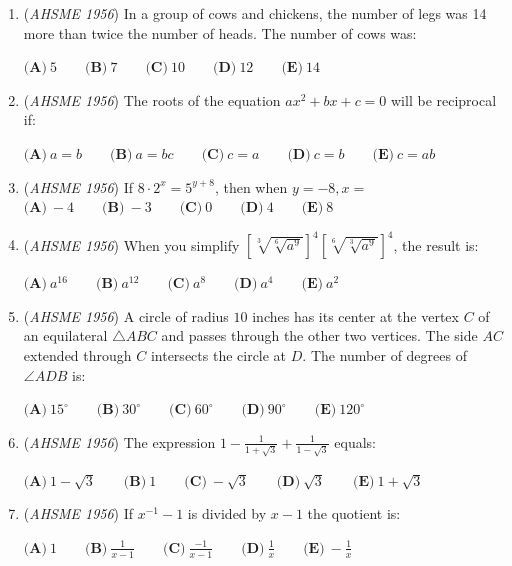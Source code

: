 \begin{enumerate}
	\item (\textit{AHSME 1956}) In a group of cows and chickens, the number of legs was 14 more than twice the number of heads. The number of cows was: 


 $\textbf{(A)}\ 5 \qquad\textbf{(B)}\ 7 \qquad\textbf{(C)}\ 10 \qquad\textbf{(D)}\ 12 \qquad\textbf{(E)}\ 14$


	\item (\textit{AHSME 1956}) The roots of the equation $ax^2 + bx + c = 0$ will be reciprocal if: 


 $\textbf{(A)}\ a = b \qquad\textbf{(B)}\ a = bc \qquad\textbf{(C)}\ c = a \qquad\textbf{(D)}\ c = b \qquad\textbf{(E)}\ c = ab$


	\item (\textit{AHSME 1956}) If $8\cdot2^x = 5^{y + 8}$, then when $y = - 8,x =$
$\textbf{(A)}\ - 4 \qquad\textbf{(B)}\ - 3 \qquad\textbf{(C)}\ 0 \qquad\textbf{(D)}\ 4 \qquad\textbf{(E)}\ 8$


	\item (\textit{AHSME 1956}) When you simplify $\left[ \sqrt [3]{\sqrt [6]{a^9}} \right]^4\left[ \sqrt [6]{\sqrt [3]{a^9}} \right]^4$, the result is: 


 $\textbf{(A)}\ a^{16} \qquad\textbf{(B)}\ a^{12} \qquad\textbf{(C)}\ a^8 \qquad\textbf{(D)}\ a^4 \qquad\textbf{(E)}\ a^2$


	\item (\textit{AHSME 1956}) A circle of radius $10$ inches has its center at the vertex $C$ of an equilateral $\triangle ABC$ and passes through the other two vertices. 
The side $AC$ extended through $C$ intersects the circle at $D$. The number of degrees of $\angle ADB$ is: 


 $\textbf{(A)}\ 15^{\circ} \qquad \textbf{(B)}\ 30^{\circ} \qquad \textbf{(C)}\ 60^{\circ} \qquad \textbf{(D)}\ 90^{\circ} \qquad \textbf{(E)}\ 120^{\circ}$


	\item (\textit{AHSME 1956}) The expression $1 - \frac {1}{1 + \sqrt {3}} + \frac {1}{1 - \sqrt {3}}$ equals: 


 $\textbf{(A)}\ 1-\sqrt{3}\qquad \textbf{(B)}\ 1\qquad \textbf{(C)}\ -\sqrt{3}\qquad \textbf{(D)}\ \sqrt{3}\qquad \textbf{(E)}\ 1+\sqrt{3}$


	\item (\textit{AHSME 1956}) If $x^{ - 1} - 1$ is divided by $x - 1$ the quotient is: 


 $\textbf{(A)}\ 1\qquad \textbf{(B)}\ \frac{1}{x-1}\qquad \textbf{(C)}\ \frac{-1}{x-1}\qquad \textbf{(D)}\ \frac{1}{x}\qquad \textbf{(E)}\ -\frac{1}{x}$



\end{enumerate}
